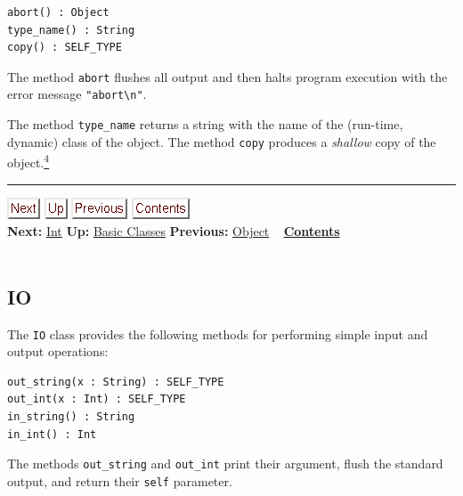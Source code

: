 \documentclass[]{article}
\begin{document}
\begin{verbatim}
abort() : Object
type_name() : String
copy() : SELF_TYPE
\end{verbatim}

The method \texttt{abort} flushes all output and then halts program
execution with the error message \texttt{"abort\textbackslash{}n"}.

The method \texttt{type\_name} returns a string with the name of the
(run-time, dynamic) class of the object. The method \texttt{copy}
produces a \emph{shallow} copy of the
object.\href{footnode.html\#foot715}{\textsuperscript{4}}

\begin{center}\rule{3in}{0.4pt}\end{center}

\href{node29.html}{\includegraphics{next.png}}
\href{node26.html}{\includegraphics{up.png}}
\href{node27.html}{\includegraphics{prev.png}}
\href{node1.html}{\includegraphics{contents.png}} \\ \textbf{Next:}
\href{node29.html}{Int} \textbf{Up:} \href{node26.html}{Basic Classes}
\textbf{Previous:} \href{node27.html}{Object} ~
\textbf{\href{node1.html}{Contents}} \\ \\

\subsection{IO}

The \texttt{IO} class provides the following methods for performing
simple input and output operations:

\begin{verbatim}
out_string(x : String) : SELF_TYPE
out_int(x : Int) : SELF_TYPE
in_string() : String
in_int() : Int
\end{verbatim}

The methods \texttt{out\_string} and \texttt{out\_int} print their
argument, flush the standard output, and return their \texttt{self}
parameter.
\end{document}

